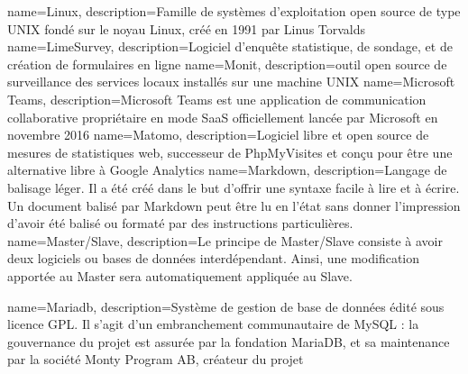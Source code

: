 {
    name=Linux,
    description={Famille de systèmes d'exploitation open source de type UNIX fondé sur le noyau Linux, créé en 1991 par Linus Torvalds}
}
{
    name=LimeSurvey,
    description={Logiciel d'enquête statistique, de sondage, et de création de formulaires en ligne}
}
{
    name=Monit,
    description={outil open source de surveillance des services locaux installés sur une machine UNIX}
}
{
    name=Microsoft Teams,
    description={Microsoft Teams est une application de communication collaborative propriétaire en mode SaaS officiellement lancée par Microsoft en novembre 2016}
}
{
    name=Matomo,
    description={Logiciel libre et open source de mesures de statistiques web, successeur de PhpMyVisites et conçu pour être une alternative libre à Google Analytics}
}
{
    name=Markdown,
    description={Langage de balisage léger. Il a été créé dans le but d'offrir une syntaxe facile à lire et à écrire. Un document balisé par Markdown peut être lu en l'état sans donner l’impression d'avoir été balisé ou formaté par des instructions particulières.}
}
{
    name=Master/Slave,
    description={Le principe de Master/Slave consiste à avoir deux logiciels ou bases de données interdépendant. Ainsi, une modification apportée au Master sera automatiquement appliquée au Slave.}
}

{
    name=Mariadb,
    description={Système de gestion de base de données édité sous licence GPL. Il s'agit d'un embranchement communautaire de MySQL : la gouvernance du projet est assurée par la fondation MariaDB, et sa maintenance par la société Monty Program AB, créateur du projet}
}


